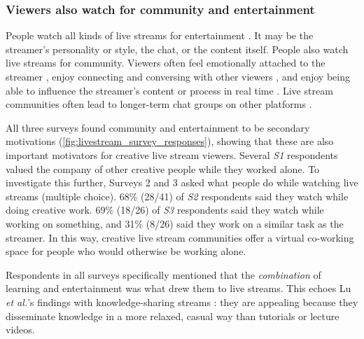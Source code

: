 \subsubsection{Viewers also watch for community and entertainment}
People watch all kinds of live streams for entertainment \cite{Wohn2018, Lu2018a, Hilvert-Bruce2018, Faas2018, Cheung2011}. It may be the streamer's personality or style, the chat, or the content itself. %
People also watch live streams for community. Viewers often feel emotionally attached to the streamer \cite{Wohn2018, Hu2017}, enjoy connecting and conversing with other viewers \cite{Lu2019, Lu2018, Hilvert-Bruce2018}, and enjoy being able to influence the streamer's content or process in real time \cite{Lu2018a}. Live stream communities often lead to longer-term chat groups on other platforms \cite{Lu2018a, Faas2018}.

All three surveys found community and entertainment to be secondary motivations (\autoref{fig:livestream_survey_responses}), showing that these are also important motivators for creative live stream viewers. Several \textit{S1} respondents valued the company of other creative people while they worked alone. To investigate this further, Surveys 2 and 3 asked what people do while watching live streams (multiple choice). 68\% (28/41) of \textit{S2} respondents said they watch while doing creative work. 69\% (18/26) of \textit{S3} respondents said they watch while working on something, and 31\% (8/26) said they work on a similar task as the streamer. In this way, creative live stream communities offer a virtual co-working space for people who would otherwise be working alone.

Respondents in all surveys specifically mentioned that the \textit{combination} of learning and entertainment was what drew them to live streams. This echoes Lu \textit{et al.}'s findings with knowledge-sharing streams \cite{Lu2018a}: they are appealing because they disseminate knowledge in a more relaxed, casual way than tutorials or lecture videos.




